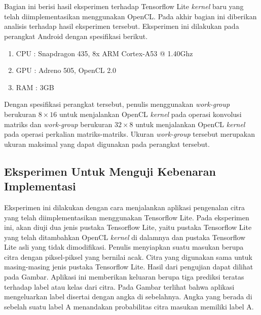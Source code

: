 \chapter{\babLima}
Bagian ini berisi hasil eksperimen terhadap Tensorflow Lite \textit{kernel} baru yang telah diimplementasikan menggunakan OpenCL. Pada akhir bagian ini diberikan analisis terhadap hasil eksperimen tersebut. Eksperimen ini dilakukan pada perangkat Android dengan spesifikasi berikut.

\begin{enumerate}
	\item CPU : Snapdragon 435, 8x ARM Cortex-A53 @ 1.40Ghz
	\item GPU : Adreno 505, OpenCL 2.0
	\item RAM : 3GB
\end{enumerate}

Dengan spesifikasi perangkat tersebut, penulis menggunakan \textit{work-group} berukuran $8 \times 16$ untuk menjalankan OpenCL \textit{kernel} pada operasi konvolusi matriks dan \textit{work-group} berukuran $32 \times 8$ untuk menjalankan OpenCL \textit{kernel} pada operasi perkalian matriks-matriks. Ukuran \textit{work-group} tersebut merupakan ukuran maksimal yang dapat digunakan pada perangkat tersebut.

\section{Eksperimen Untuk Menguji Kebenaran Implementasi }
Eksperimen ini dilakukan dengan cara menjalankan aplikasi pengenalan citra yang telah diimplementasikan menggunakan Tensorflow Lite. Pada eksperimen ini, akan diuji dua jenis pustaka Tensorflow Lite, yaitu pustaka Tensorflow Lite yang telah ditambahkan OpenCL \textit{kernel} di dalamnya dan pustaka Tensorflow Lite asli yang tidak dimodifikasi. Penulis menyiapkan suatu masukan berupa citra dengan piksel-piksel yang bernilai acak. Citra yang digunakan sama untuk masing-masing jenis pustaka Tensorflow Lite. Hasil dari pengujian dapat dilihat pada Gambar. Aplikasi ini memberikan keluaran berupa tiga prediksi teratas terhadap label atau kelas dari citra. Pada Gambar terlihat bahwa aplikasi mengeluarkan label disertai dengan angka di sebelahnya. Angka yang berada di sebelah suatu label A menandakan probabilitas citra masukan memiliki label A.

